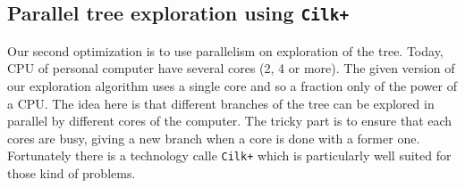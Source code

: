 \documentclass[reqno,11pt]{amsart}
\theoremstyle{plain}
\theoremstyle{definition}
\renewcommand{\leq}{\leqslant}
\renewcommand{\tt}[1]{\texttt{#1}}
\begin{document}


\subsection{Parallel tree exploration using \texttt{Cilk+}}

Our second optimization is to use parallelism on exploration of the tree.
Today, CPU of personal computer have several cores (2, 4 or more).  The given
version of our exploration algorithm uses a single core and so a fraction only
of the power of a CPU. The idea here is that different branches of the tree can
be explored in parallel by different cores of the computer. The tricky part is
to ensure that each cores are busy, giving a new branch when a core is done
with a former one. Fortunately there is a technology calle \texttt{Cilk+}
which is particularly well suited for those kind of problems.
\end{document}
